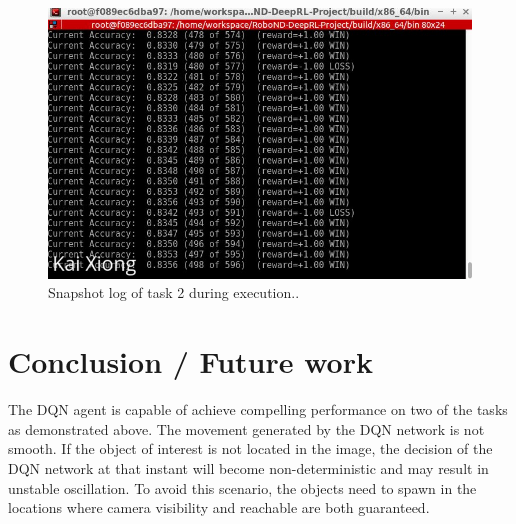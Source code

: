 \documentclass[10pt,journal,compsoc]{IEEEtran}
\begin{document}
\begin{figure}[thpb]
      \centering
      \includegraphics[scale=0.3]{task2_results_format.png}
      \caption{Snapshot log of task 2 during execution..}
      \label{fig:robot3}
\end{figure}

\section{Conclusion / Future work}
The DQN agent is capable of achieve compelling performance on two of the tasks as demonstrated above. The movement generated by the DQN network is not smooth. If the object of interest is not located in the image, the decision of the DQN network at that instant will become non-deterministic and may result in unstable oscillation. To avoid this scenario, the objects need to spawn in the locations where camera visibility and reachable are both guaranteed.
\end{document}
